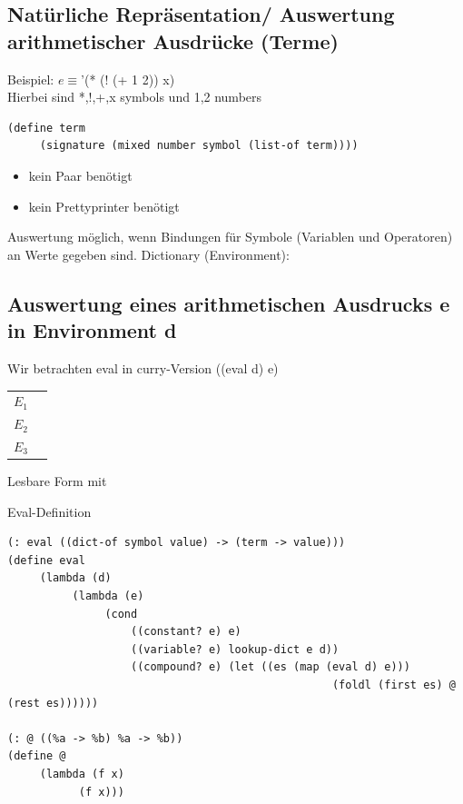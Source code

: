 \documentclass[paper=a4, fontsize=11pt]{scrartcl}
\numberwithin{equation}{section}
\numberwithin{figure}{section}
\numberwithin{table}{section}
\begin{document}
\begin{lstlistig}
\subsection{Natürliche Repräsentation/ Auswertung arithmetischer Ausdrücke (Terme)}
Beispiel: $e \equiv $'(* (! (+ 1 2)) x) \\
Hierbei sind *,!,+,x symbols und 1,2 numbers \\
\begin{lstlisting}
(define term
     (signature (mixed number symbol (list-of term))))
\end{lstlisting}
\begin{itemize}
\item kein Paar benötigt
\item kein Prettyprinter benötigt
\end{itemize}

Auswertung möglich, wenn Bindungen für Symbole (Variablen und Operatoren) an Werte gegeben sind. Dictionary (Environment): \\

\subsection{Auswertung eines arithmetischen Ausdrucks e in Environment d}
Wir betrachten eval in curry-Version ((eval d) e) \\
\begin{tabular}{cc}
$E_{1}$ & \\
$E_{2}$ & \\
$E_{3}$ & \\
\end{tabular}

Lesbare Form mit 

Eval-Definition 
\begin{lstlisting}
(: eval ((dict-of symbol value) -> (term -> value)))
(define eval
     (lambda (d)
          (lambda (e)
               (cond
                   ((constant? e) e)
                   ((variable? e) lookup-dict e d))
                   ((compound? e) (let ((es (map (eval d) e)))
                                                  (foldl (first es) @ (rest es))))))
                                                  
(: @ ((%a -> %b) %a -> %b))
(define @
     (lambda (f x)
           (f x)))                                                  
\end{lstlisting}


\end{lstlistig}
\end{document}

